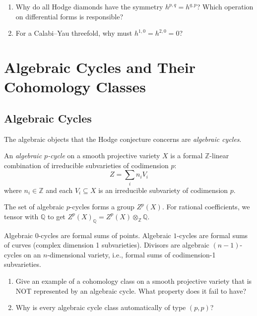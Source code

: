 \begin{checkyou}
\begin{enumerate}
\item Why do all Hodge diamonds have the symmetry $h^{p,q} = h^{q,p}$? Which operation on differential forms is responsible?
\item For a Calabi--Yau threefold, why must $h^{1,0} = h^{2,0} = 0$?
\end{enumerate}
\end{checkyou}

\section{Algebraic Cycles and Their Cohomology Classes}

\subsection{Algebraic Cycles}

The algebraic objects that the Hodge conjecture concerns are \emph{algebraic cycles}.

\begin{definition}
An \emph{algebraic $p$-cycle} on a smooth projective variety $X$ is a formal $\mathbb{Z}$-linear combination of irreducible subvarieties of codimension $p$:
\[
Z = \sum_i n_i V_i
\]
where $n_i \in \mathbb{Z}$ and each $V_i \subseteq X$ is an irreducible subvariety of codimension $p$.
\end{definition}

The set of algebraic $p$-cycles forms a group $Z^p(X)$. For rational coefficients, we tensor with $\mathbb{Q}$ to get $Z^p(X)_{\mathbb{Q}} = Z^p(X) \otimes_{\mathbb{Z}} \mathbb{Q}$.

\begin{example}
Algebraic $0$-cycles are formal sums of points.
Algebraic $1$-cycles are formal sums of curves (complex dimension 1 subvarieties).
Divisors are algebraic $(n-1)$-cycles on an $n$-dimensional variety, i.e., formal sums of codimension-1 subvarieties.
\end{example}

\begin{checkyou}
\begin{enumerate}
\item Give an example of a cohomology class on a smooth projective variety that is NOT represented by an algebraic cycle. What property does it fail to have?
\item Why is every algebraic cycle class automatically of type $(p,p)$?
\end{enumerate}
\end{checkyou}

